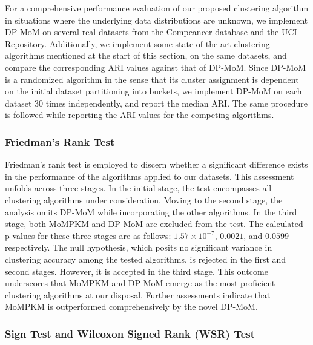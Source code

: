 \documentclass[11pt]{article}
\begin{document}
For a comprehensive performance evaluation of our proposed clustering algorithm in situations where the underlying data distributions are unknown, we implement DP-MoM on several real datasets from the Compcancer database and the UCI Repository. Additionally, we implement some state-of-the-art clustering algorithms mentioned at the start of this section, on the same datasets, and compare the corresponding ARI values against that of DP-MoM. Since DP-MoM is a randomized algorithm in the sense that its cluster assignment is dependent on the initial dataset partitioning into buckets, we implement DP-MoM on each dataset $30$ times independently, and report the median ARI. The same procedure is followed while reporting the ARI values for the competing algorithms.

\subsubsection{Friedman's Rank Test} 

Friedman's rank test \citep{friedman} is employed to discern whether a significant difference exists in the performance of the algorithms applied to our datasets. This assessment unfolds across three stages. In the initial stage, the test encompasses all clustering algorithms under consideration. Moving to the second stage, the analysis omits DP-MoM while incorporating the other algorithms. In the third stage, both MoMPKM and DP-MoM are excluded from the test. The calculated p-values for these three stages are as follows: $1.57 \times 10^{-7}$, $0.0021$, and $0.0599$ respectively. The null hypothesis, which posits no significant variance in clustering accuracy among the tested algorithms, is rejected in the first and second stages. However, it is accepted in the third stage. This outcome underscores that MoMPKM and DP-MoM emerge as the most proficient clustering algorithms at our disposal. Further assessments indicate that MoMPKM is outperformed comprehensively by the novel DP-MoM. 

\subsubsection{Sign Test and Wilcoxon Signed Rank (WSR) Test}
\end{document}
